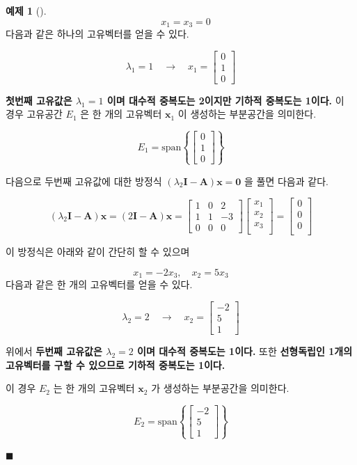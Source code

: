 \documentclass[
  11pt,
  a4paper,
  oneside]{scrbook}
\theoremstyle{definition}
\theoremstyle{definition}
\newtheorem{exercise}{예제}[chapter]
\theoremstyle{plain}
\theoremstyle{remark}
\begin{document}
\begin{exercise}[]
\[ \quad x_1 = x_3 =0 \] 다음과 같은 하나의 고유벡터를 얻을 수 있다.

\[ \lambda_1=1 \quad \rightarrow \quad  x_1=\begin{bmatrix} 0 \\ 1 \\ 0 \end{bmatrix} \]

\textbf{첫번째 고유값은 \(\lambda_1=1\) 이며 대수적 중복도는 2이지만
기하적 중복도는 1이다.} 이 경우 고유공간 \(E_1\) 은 한 개의 고유벡터
\(\pmb x_1\) 이 생성하는 부분공간을 의미한다.

\[
E_1 = \text{span}\left\{\begin{bmatrix}0 \\ 1 \\ 0\end{bmatrix} \right\}
\]

다음으로 두번째 고유값에 대한 방정식
\((\lambda_2 \pmb I -\pmb A )\pmb x = \pmb 0\) 을 풀면 다음과 같다.

\[
(\lambda_2 \pmb I -\pmb A )\pmb x= (2\pmb I -\pmb A )\pmb x = 
\begin{bmatrix}
1 & 0 & 2 \\
1 & 1 & -3 \\
0 & 0 & 0
\end{bmatrix}
\begin{bmatrix}
x_1 \\
x_2 \\
x_3 \\
\end{bmatrix}
=
\begin{bmatrix}
0 \\
0 \\
0 \\
\end{bmatrix}
\]

이 방정식은 아래와 같이 간단히 할 수 있으며

\[ x_1 = -2x_3, \quad x_2=5x_3  \] 다음과 같은 한 개의 고유벡터를 얻을
수 있다.

\[ 
\lambda_2=2\quad \rightarrow \quad  x_2=\begin{bmatrix}-2 \\ 5 \\ 1\end{bmatrix} 
\]

위에서 \textbf{두번째 고유값은 \(\lambda_2=2\) 이며 대수적 중복도는
1이다.} 또한 \textbf{선형독립인 1개의 고유벡터를 구할 수 있으므로 기하적
중복도는 1이다.}

이 경우 \(E_2\) 는 한 개의 고유벡터 \(\pmb x_2\) 가 생성하는 부분공간을
의미한다.

\[
E_2 = \text{span}\left\{\begin{bmatrix}-2\\ 5 \\ 1\end{bmatrix}\right\}
\]

\(\blacksquare\)

\end{exercise}
\end{document}
